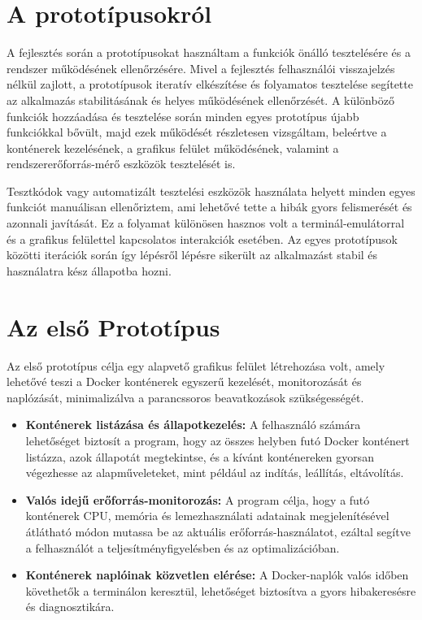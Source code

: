 
\section{A prototípusokról}
A fejlesztés során a prototípusokat használtam a funkciók önálló tesztelésére és a rendszer működésének ellenőrzésére. Mivel a fejlesztés felhasználói visszajelzés nélkül zajlott, a prototípusok iteratív elkészítése és folyamatos tesztelése segítette az alkalmazás stabilitásának és helyes működésének ellenőrzését. A különböző funkciók hozzáadása és tesztelése során minden egyes prototípus újabb funkciókkal bővült, majd ezek működését részletesen vizsgáltam, beleértve a konténerek kezelésének, a grafikus felület működésének, valamint a rendszererőforrás-mérő eszközök tesztelését is.

Tesztkódok vagy automatizált tesztelési eszközök használata helyett minden egyes funkciót manuálisan ellenőriztem, ami lehetővé tette a hibák gyors felismerését és azonnali javítását. Ez a folyamat különösen hasznos volt a terminál-emulátorral és a grafikus felülettel kapcsolatos interakciók esetében. Az egyes prototípusok közötti iterációk során így lépésről lépésre sikerült az alkalmazást stabil és használatra kész állapotba hozni.


\section{Az első Prototípus}

Az első prototípus célja egy alapvető grafikus felület létrehozása volt, amely lehetővé teszi a Docker konténerek egyszerű kezelését, monitorozását és naplózását, minimalizálva a parancssoros beavatkozások szükségességét. 

\begin{itemize}
	\item \textbf{Konténerek listázása és állapotkezelés:} A felhasználó számára lehetőséget biztosít a program, hogy az összes helyben futó Docker konténert listázza, azok állapotát megtekintse, és a kívánt konténereken gyorsan végezhesse az alapműveleteket, mint például az indítás, leállítás, eltávolítás.
	\item \textbf{Valós idejű erőforrás-monitorozás:} A program célja, hogy a futó konténerek CPU, memória és lemezhasználati adatainak megjelenítésével átlátható módon mutassa be az aktuális erőforrás-használatot, ezáltal segítve a felhasználót a teljesítményfigyelésben és az optimalizációban.
	\item \textbf{Konténerek naplóinak közvetlen elérése:} A Docker-naplók valós időben követhetők a terminálon keresztül, lehetőséget biztosítva a gyors hibakeresésre és diagnosztikára.
\end{itemize}

